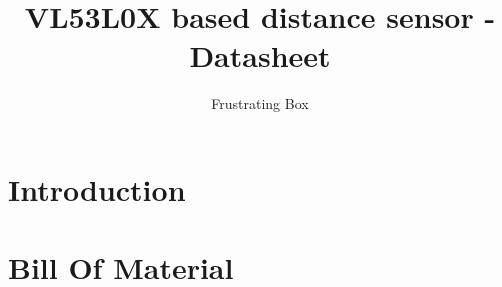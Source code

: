 \documentclass[12pt,a4paper]{article}
\author{Frustrating Box}
\title{VL53L0X based distance sensor - Datasheet}
\begin{document}
\maketitle

\section{Introduction}
	
\section{Bill Of Material}
	
\end{document}
